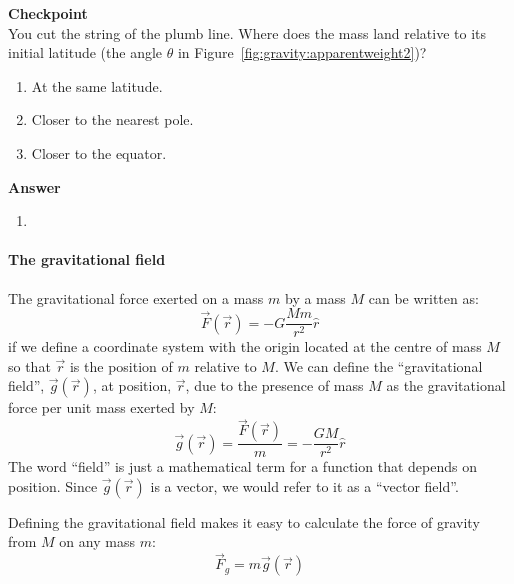 \begin{framed}
\textbf{Checkpoint}\\
You cut the string of the plumb line. Where does the mass land relative to its initial latitude (the angle $\theta$ in Figure~\ref{fig:gravity:apparentweight2})?

\begin{enumerate}
\item At the same latitude.
\item Closer to the nearest pole.
\item Closer to the equator.
\end{enumerate}

\begin{framed}
\textbf{Answer}\\
\begin{enumerate}
\item
\end{enumerate}
\end{framed}
\end{framed}

\paragraph{The gravitational field}

The gravitational force exerted on a mass $m$ by a mass $M$ can be written as:
\begin{equation}
\vec F(\vec r) = -G\frac{Mm}{r^2}\hat r
\end{equation}
if we define a coordinate system with the origin located at the centre of mass $M$ so that $\vec r$ is the position of $m$ relative to $M$. We can define the ``gravitational field'', $\vec g(\vec r)$, at position, $\vec r$, due to the presence of mass $M$ as the gravitational force per unit mass exerted by $M$:
\begin{equation}
\boxed{\vec g(\vec r) = \frac{\vec F(\vec r)}{m} =  - \frac{GM}{r^2}\hat r}
\end{equation}
The word ``field'' is just a mathematical term for a function that depends on position. Since $\vec g(\vec r)$ is a vector, we would refer to it as a ``vector field''.

Defining the gravitational field makes it easy to calculate the force of gravity from $M$ on any mass $m$:
\begin{equation}
\vec F_g = m\vec g(\vec r)
\end{equation}

